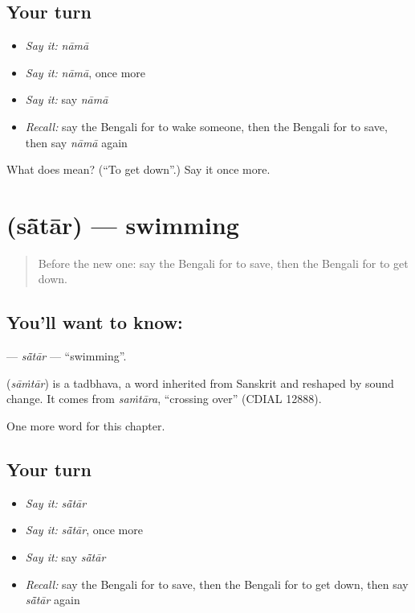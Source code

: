 \subsection*{Your turn}
\begin{itemize}
\raggedright
  \item \emph{Say it:} \emph{nāmā}
  \item \emph{Say it:} \emph{nāmā}, once more
  \item \emph{Say it:} say \emph{nāmā}
  \item \emph{Recall:} say the Bengali for to wake someone, then the Bengali for to save, then say \emph{nāmā} again
\end{itemize}

\begin{tcolorbox}[breakable,colback=teal!4,colframe=teal!35!black,title={Before you move on}]
What does  mean? (\textquotedblleft{}To get down\textquotedblright{}.) Say it once more.
\end{tcolorbox}
\section[\texorpdfstring{\bn{সাঁতার} (sā̃tār)}{সাঁতার (sā̃tār)}]{ (sā̃tār) — swimming}

\label{lesson:BN-C103-satar}



\begin{quote}
Before the new one: say the Bengali for to save, then the Bengali for to get down.
\end{quote}

\subsection*{You'll want to know: }
\textbf{} — \emph{sā̃tār} — \textquotedblleft{}swimming\textquotedblright{}.

\begin{cousinweb}
\textbf{} (\emph{sāṁtār}) is a tadbhava, a word inherited from Sanskrit and reshaped by sound change. It comes from \emph{saṁtāra}, \textquotedblleft{}crossing over\textquotedblright{} (CDIAL 12888).
\end{cousinweb}

\begin{grammarlens}[title={What you've built}]
One more word for this chapter.
\end{grammarlens}

\subsection*{Your turn}
\begin{itemize}
\raggedright
  \item \emph{Say it:} \emph{sā̃tār}
  \item \emph{Say it:} \emph{sā̃tār}, once more
  \item \emph{Say it:} say \emph{sā̃tār}
  \item \emph{Recall:} say the Bengali for to save, then the Bengali for to get down, then say \emph{sā̃tār} again
\end{itemize}

